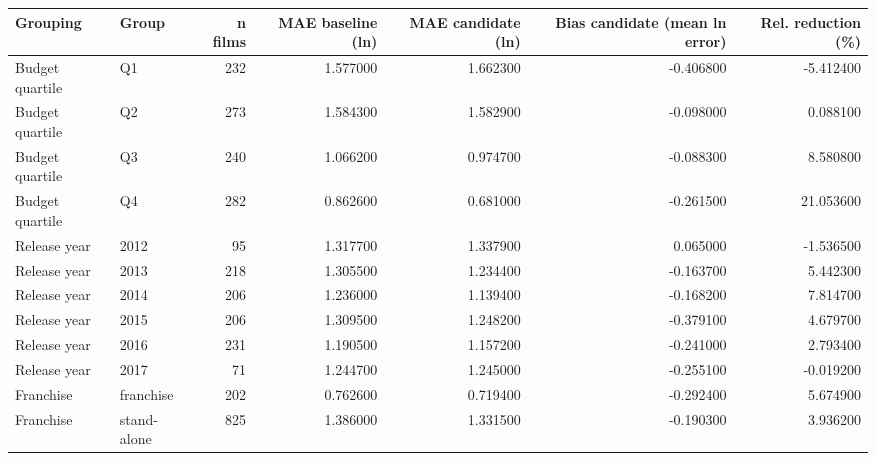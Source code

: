\begin{tabular}{llrrrrr}
\toprule
Grouping & Group & n films & MAE baseline (ln) & MAE candidate (ln) & Bias candidate (mean ln error) & Rel. reduction (\%) \\
\midrule
Budget quartile & Q1 & 232 & 1.577000 & 1.662300 & -0.406800 & -5.412400 \\
Budget quartile & Q2 & 273 & 1.584300 & 1.582900 & -0.098000 & 0.088100 \\
Budget quartile & Q3 & 240 & 1.066200 & 0.974700 & -0.088300 & 8.580800 \\
Budget quartile & Q4 & 282 & 0.862600 & 0.681000 & -0.261500 & 21.053600 \\
Release year & 2012 & 95 & 1.317700 & 1.337900 & 0.065000 & -1.536500 \\
Release year & 2013 & 218 & 1.305500 & 1.234400 & -0.163700 & 5.442300 \\
Release year & 2014 & 206 & 1.236000 & 1.139400 & -0.168200 & 7.814700 \\
Release year & 2015 & 206 & 1.309500 & 1.248200 & -0.379100 & 4.679700 \\
Release year & 2016 & 231 & 1.190500 & 1.157200 & -0.241000 & 2.793400 \\
Release year & 2017 & 71 & 1.244700 & 1.245000 & -0.255100 & -0.019200 \\
Franchise & franchise & 202 & 0.762600 & 0.719400 & -0.292400 & 5.674900 \\
Franchise & stand-alone & 825 & 1.386000 & 1.331500 & -0.190300 & 3.936200 \\
\bottomrule
\end{tabular}
